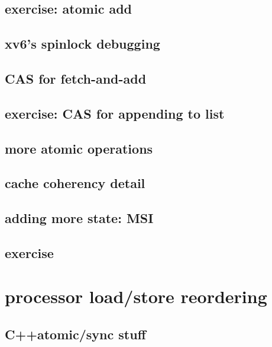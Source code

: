 \subsection{exercise: atomic add}

\subsection{xv6's spinlock debugging}



\subsection{CAS for fetch-and-add}


\subsection{exercise: CAS for appending to list}



\subsection{more atomic operations}



\subsection{cache coherency detail}
\subsection{adding more state: MSI}


\subsection{exercise}



\section{processor load/store reordering}


\subsection{C++atomic/sync stuff}


